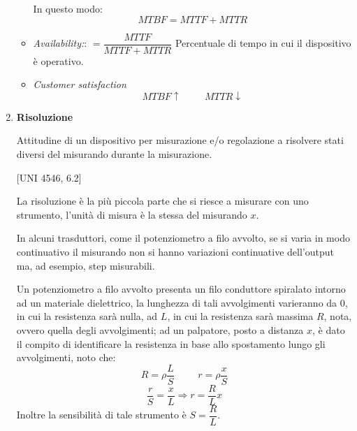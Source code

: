 \documentclass[a4paper, 15pt]{article}
\begin{document}
\begin{adjustwidth}{2in}{}
\begin{enumerate}
\begin{itemize}
		In questo modo:
		\[MTBF = MTTF + MTTR\]
		\item \textit{Availability:}: $=\dfrac{MTTF}{MTTF + MTTR}$ \newline 
		Percentuale di tempo in cui il dispositivo è operativo.
		\item \textit{Customer satisfaction}
		\[MTBF \uparrow \hspace{1cm} MTTR \downarrow\]
	\end{itemize}

\newpage
		
\item \textbf{Risoluzione} 
 
		Attitudine di un dispositivo per misurazione e/o regolazione a risolvere stati
		diversi del misurando durante la misurazione.
		
		[UNI 4546, 6.2] \newline
		
		La risoluzione è la più piccola parte che si riesce a misurare con uno strumento, l'unità di misura è la stessa del misurando $x$. \newline
		
		In alcuni trasduttori, come il potenziometro a filo avvolto, se si varia in modo continuativo il misurando non si hanno variazioni continuative dell'output ma, ad esempio, step misurabili. \newline 
		
		Un potenziometro a filo avvolto presenta un filo conduttore spiralato intorno ad un materiale dielettrico, la lunghezza di tali avvolgimenti varieranno da $0$, in cui la resistenza sarà nulla, ad $L$, in cui la resistenza sarà massima $R$, nota, ovvero quella degli avvolgimenti; ad un palpatore, posto a distanza $x$, è dato il compito di identificare la resistenza in base allo spostamento lungo gli avvolgimenti, noto che:
		\[ R = \rho \dfrac{L}{S} \hspace{1cm} r = \rho \dfrac{x}{S}\]
		\[ \dfrac{r}{S} = \dfrac{x}{L} \Rightarrow r = \dfrac{R}{L}x\]
		Inoltre la sensibilità di tale strumento è $S = \dfrac{R}{L}$. \newline 
		

\end{enumerate}
\end{adjustwidth}
\end{document}

